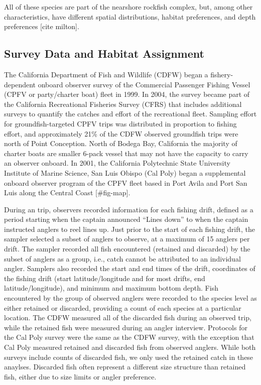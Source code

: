 \documentclass[
  authoryear,
  preprint,
  3p]{elsarticle}
\begin{document}
All of these species are part of the nearshore rockfish complex, but,
among other characteristics, have different spatial distributions,
habitat preferences, and depth preferences {[}cite milton{]}.

\hypertarget{survey-data-and-habitat-assignment}{%
\subsection{Survey Data and Habitat
Assignment}\label{survey-data-and-habitat-assignment}}

The California Department of Fish and Wildlife (CDFW) began a
fishery-dependent onboard observer survey of the Commercial Passenger
Fishing Vessel (CPFV or party/charter boat) fleet in 1999. In 2004, the
survey became part of the California Recreational Fisheries Survey
(CFRS) that includes additional surveys to quantify the catches and
effort of the recreational fleet. Sampling effort for
groundfish-targeted CPFV trips was distributed in proportion to fishing
effort, and approximately 21\% of the CDFW observed groundfish trips
were north of Point Conception. North of Bodega Bay, California the
majority of charter boats are smaller 6-pack vessel that may not have
the capacity to carry an observer onboard. In 2001, the California
Polytechnic State University Institute of Marine Science, San Luis
Obispo (Cal Poly) began a supplemental onboard observer program of the
CPFV fleet based in Port Avila and Port San Luis along the Central Coast
{[}\#fig-map{]}.

During an trip, observers recorded information for each fishing drift,
defined as a period starting when the captain announced ``Lines down''
to when the captain instructed anglers to reel lines up. Just prior to
the start of each fishing drift, the sampler selected a subset of
anglers to observe, at a maximum of 15 anglers per drift. The sampler
recorded all fish encountered (retained and discarded) by the subset of
anglers as a group, i.e., catch cannot be attributed to an individual
angler. Samplers also recorded the start and end times of the drift,
coordinates of the fishing drift (start latitude/longitude and for most
drifts, end latitude/longitude), and minimum and maximum bottom depth.
Fish encountered by the group of observed anglers were recorded to the
species level as either retained or discarded, providing a count of each
species at a particular location. The CDFW measured all of the discarded
fish during an observed trip, while the retained fish were measured
during an angler interview. Protocols for the Cal Poly survey were the
same as the CDFW survey, with the exception that Cal Poly measured
retained and discarded fish from observed anglers. While both surveys
include counts of discarded fish, we only used the retained catch in
these anaylses. Discarded fish often represent a different size
structure than retained fish, either due to size limits or angler
preference.
\end{document}
